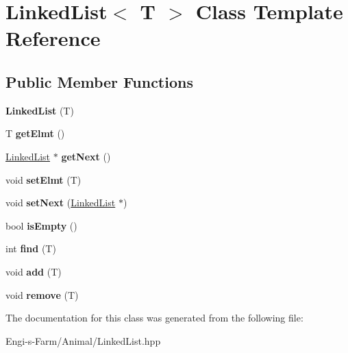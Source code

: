 \hypertarget{class_linked_list}{}\section{Linked\+List$<$ T $>$ Class Template Reference}
\label{class_linked_list}
\subsection*{Public Member Functions}
\begin{DoxyCompactItemize}
\item 
\mbox{\label{class_linked_list_a41e4c3a1bad7c4af82510d1fac7c837b}} 
{\bfseries Linked\+List} (T)
\item 
\mbox{\label{class_linked_list_a0db8b25b1cfcd09e3c7ba015a5b23056}} 
T {\bfseries get\+Elmt} ()
\item 
\mbox{\label{class_linked_list_a4b0e7febc0cefb5cb6e1f7fc314deac9}} 
\mbox{\hyperlink{class_linked_list}{Linked\+List}} $\ast$ {\bfseries get\+Next} ()
\item 
\mbox{\label{class_linked_list_a8f4b0032519f5b684d7d343c912d692f}} 
void {\bfseries set\+Elmt} (T)
\item 
\mbox{\label{class_linked_list_a250bcb891ab1ccbc267fe7fafaf44ecf}} 
void {\bfseries set\+Next} (\mbox{\hyperlink{class_linked_list}{Linked\+List}} $\ast$)
\item 
\mbox{\label{class_linked_list_a7ecbb28e82117a680839ed0dc28ebdce}} 
bool {\bfseries is\+Empty} ()
\item 
\mbox{\label{class_linked_list_a3d7bd3f3c2ebb14ceaee804477624a47}} 
int {\bfseries find} (T)
\item 
\mbox{\label{class_linked_list_ae9698489bc4ccc26b6ce0087877657c4}} 
void {\bfseries add} (T)
\item 
\mbox{\label{class_linked_list_a176b8ec592efa22de01fb034802ed8ea}} 
void {\bfseries remove} (T)
\end{DoxyCompactItemize}


The documentation for this class was generated from the following file\+:\begin{DoxyCompactItemize}
\item 
Engi-\/s-\/\+Farm/\+Animal/Linked\+List.\+hpp\end{DoxyCompactItemize}
